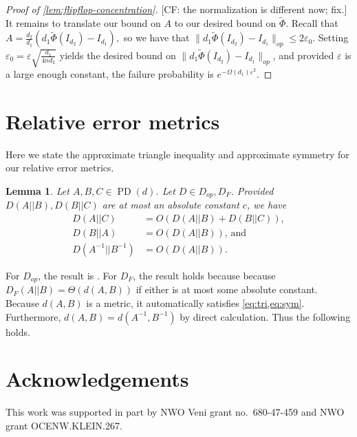\documentclass[aos]{imsart}
\newtheorem{lemma}[theorem]{Lemma}
\theoremstyle{definition}
\numberwithin{equation}{section}
\DeclareMathOperator{\PD}{PD}
\newcommand{\eps}{\varepsilon}
\newcommand{\CF}[1]{{\color{purple}[CF: #1]}}
\begin{document}
\begin{appendix}
\begin{proof}[Proof of \cref{lem:flipflop-concentration}]
\CF{the normalization is different now; fix.} It remains to translate our bound on $A$ to our desired bound on $\tilde{\Phi}$. Recall that $A = \frac{d_2}{d_1} (d_1 \tilde{\Phi}(I_{d_2}) - I_{d_1}),$ so we have that $\|d_1 \tilde{\Phi}(I_{d_2}) - I_{d_1}\|_{op} \leq 2 \eps_0$. Setting $\eps_0 = \eps \sqrt{\frac{d_1}{4n d_2}}$ yields the desired bound on $\|d_1 \tilde{\Phi}(I_{d_2}) - I_{d_1}\|_{op}$, and provided $\eps$ is a large enough constant, the failure probability is $e^{ - \Omega(d_1) \eps^2}$.\end{proof}


\section{Relative error metrics}\label{sec:rel-error}
Here we state the approximate triangle inequality and approximate symmetry for our relative error metrics. 
\begin{lemma}\label{lem:triangle-ineq}
Let $A, B, C \in \PD(d)$. Let $D \in D_{op}, D_F$. Provided $D(A||B), D(B||C)$ are at most an absolute constant $c$, we have 
\begin{align}D(A||C) &= O(D(A||B) + D(B||C)),\label{eq:tri}\\
D(B||A) &= O(D(A||B))\label{eq:sym} \text{, and }\\  
D(A^{-1}||B^{-1}) &= O(D(A||B)).
\end{align}
\end{lemma}
For $D_{op}$, the result is \cite[Lemma C.1]{FM20}. For $D_F$, the result holds because because $D_F(A|| B) = \Theta(d(A, B))$ if either is at most some absolute constant. Because $d(A, B)$ is a metric, it automatically satisfies \cref{eq:tri,eq:sym}. Furthermore, $d(A,B) = d(A^{-1}, B^{-1})$ by direct calculation. Thus the following holds.


\end{appendix}




\section*{Acknowledgements}
This work was supported in part by NWO Veni grant no.~680-47-459 and NWO grant OCENW.KLEIN.267.




\end{document}
